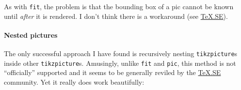 \documentclass[12pt]{article}
\begin{document}
\begin{center}
\end{center}

As with \texttt{fit}, the problem is that the bounding box of a pic cannot be
known until \emph{after} it is rendered. I don't think there is a workaround
(see \href{http://tex.stackexchange.com/q/185279/124082}{TeX.SE}).

\paragraph{Nested pictures} The only successful approach I have found is
recursively nesting \texttt{tikzpicture}s inside other
\texttt{tikzpicture}s. Amusingly, unlike \texttt{fit} and \texttt{pic}, this
method is not ``officially'' supported and it seems to be generally reviled by
the \href{http://tex.stackexchange.com/q/47377/124082}{TeX.SE} community. Yet
it really does work beautifully:
\end{document}
